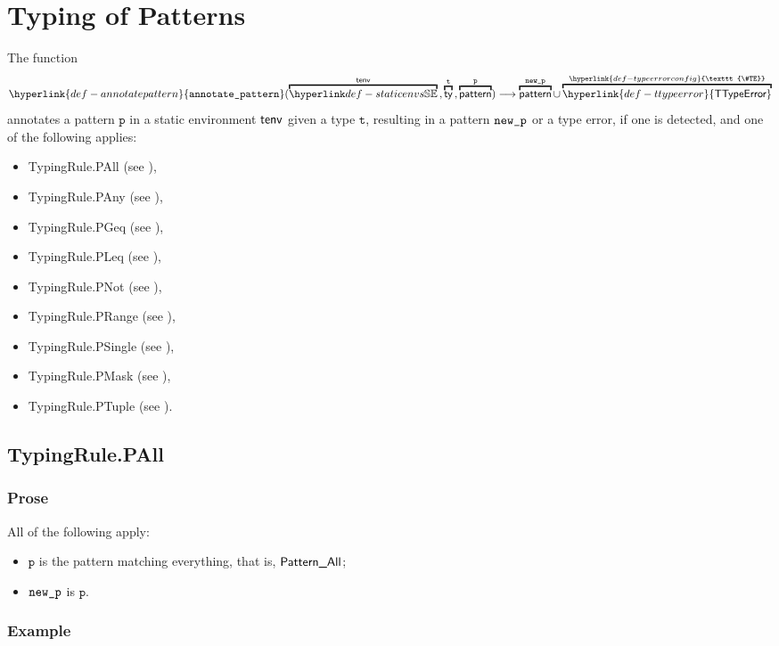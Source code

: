 \documentclass{book}
\newcommand\TTypeError[0]{\hyperlink{def-ttypeerror}{\textsf{TTypeError}}}
\newcommand\TypeErrorConfig[0]{\hyperlink{def-typeerrorconfig}{\texttt{\#TE}}}
\newcommand\annotatepattern[0]{\hyperlink{def-annotatepattern}{\texttt{annotate\_pattern}}}
\newcommand\vp[0]{\texttt{p}}
\newcommand\vt[0]{\texttt{t}}
\begin{document}
\chapter{Typing of Patterns}
\hypertarget{def-annotatepattern}{}
The function
\[
  \annotatepattern(
    \overname{\staticenvs}{\tenv} \aslsep
    \overname{\ty}{\vt} \aslsep
    \overname{\pattern}{\vp}) \aslto \overname{\pattern}{\newp} \cup \overname{\TTypeError}{\TypeErrorConfig}
\]
annotates a pattern $\vp$ in a static environment $\textsf{tenv}$ given a type $\vt$,
resulting in a pattern $\texttt{new\_p}$ or a type error, if one is detected, and one of the following applies:
\begin{itemize}
\item TypingRule.PAll (see ),
\item TypingRule.PAny (see ),
\item TypingRule.PGeq (see ),
\item TypingRule.PLeq (see ),
\item TypingRule.PNot (see ),
\item TypingRule.PRange (see ),
\item TypingRule.PSingle (see ),
\item TypingRule.PMask (see ),
\item TypingRule.PTuple (see ).
\end{itemize}

\section{TypingRule.PAll \label{sec:TypingRule.PAll}}

\subsection{Prose}
All of the following apply:
\begin{itemize}
  \item $\vp$ is the pattern matching everything, that is, $\textsf{Pattern\_All}$;
  \item $\texttt{new\_p}$ is $\vp$.
\end{itemize}

\subsection{Example}
\end{document}

